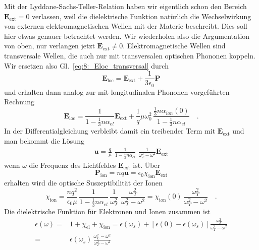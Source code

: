 Mit der Lyddane-Sachs-Teller-Relation haben wir eigentlich schon den Bereich $\bm{E}_\text{ext} = 0$ verlassen, weil die dielektrische Funktion natürlich die Wechselwirkung von externen elektromagnetischen  Wellen mit der Materie beschreibt. Dies soll hier etwas genauer betrachtet werden. Wir wiederholen also die Argumentation von oben, nur verlangen jetzt $\bm{E}_\text{ext} \neq 0$. Elektromagnetische Wellen sind transversale Wellen, die auch nur mit transversalen optischen Phononen koppeln. Wir ersetzen also Gl.~\ref{eq:8:_Eloc_transversal} durch 
\begin{equation}
    \bm{E}_\text{loc}  = \bm{E}_\text{ext}  + \frac{1}{3\epsilon_0} \bm{P} 
\end{equation}
und erhalten dann analog zur mit longitudinalen Phononen vorgeführten Rechnung  
\begin{equation}
    \bm{E}_\text{loc} =
 \frac{1}{1 - \frac{1}{3} n \alpha_{el} }  \bm{E}_\text{ext}  
    + \frac{1}{q} \mu \omega_0^2 \, \frac{\frac{1}{3} n \alpha_{ion}(0)}{1 - \frac{1}{3} n \alpha_{el} } \quad .
\end{equation}
In der Differentialgleichung verbleibt damit ein treibender Term mit $ \bm{E}_\text{ext} $ und man bekommt die Lösung
\begin{eqnarray}
    \bm{u} =\frac{q}{\mu} \, \, \frac{1}{1 - \frac{1}{3} n \alpha_{el} } \, \, \frac{1}{\omega_T^2 - \omega^2} \bm{E}_\text{ext}  
\end{eqnarray}
wenn $\omega$ die Frequenz des Lichtfeldes $ \bm{E}_\text{ext}$ ist. Über 
\begin{equation}
    \bm{P}_\text{ion} = n q \bm{u} = \epsilon_0 \chi_\text{ion} \bm{E}_\text{ext} 
\end{equation}
erhalten wird die optische Suszeptibilität der Ionen
\begin{equation}
    \chi_\text{ion} = \frac{n q^2}{\epsilon_0 \mu} \, \frac{1}{1 - \frac{1}{3} n \alpha_{el} } \, \frac{1}{\omega_T^2} \, \, \frac{\omega_T^2}{\omega_T^2 - \omega^2} 
    = \chi_\text{ion} (0) \, \frac{\omega_T^2}{\omega_T^2 - \omega^2}  \quad .
\end{equation}
Die dielektrische Funktion für Elektronen und Ionen zusammen ist
\begin{align}
    \epsilon(\omega) = & 1 + \chi_\text{el} + \chi_\text{ion}
    = \epsilon(\omega_s) + \left[ \epsilon(0) - \epsilon(\omega_s) \right] \frac{\omega_T^2}{\omega_T^2 - \omega^2}  \\
    = & \epsilon(\omega_s) \, \frac{\omega_L^2 - \omega^2}{\omega_T^2 - \omega^2}  \label{eq:8_eps_ion}
\end{align}
